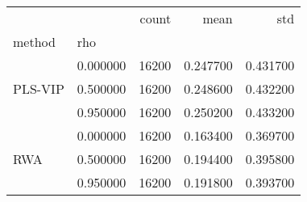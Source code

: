 \begin{tabular}{llrrr}
\toprule
 &  & count & mean & std \\
method & rho &  &  &  \\
\midrule
\multirow[t]{3}{*}{PLS-VIP} & 0.000000 & 16200 & 0.247700 & 0.431700 \\
 & 0.500000 & 16200 & 0.248600 & 0.432200 \\
 & 0.950000 & 16200 & 0.250200 & 0.433200 \\
\cline{1-5}
\multirow[t]{3}{*}{RWA} & 0.000000 & 16200 & 0.163400 & 0.369700 \\
 & 0.500000 & 16200 & 0.194400 & 0.395800 \\
 & 0.950000 & 16200 & 0.191800 & 0.393700 \\
\cline{1-5}
\bottomrule
\end{tabular}

